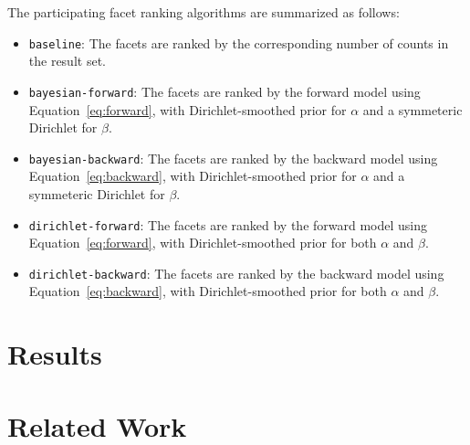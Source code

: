 The participating facet ranking algorithms are summarized as follows:
\begin{itemize}
  \item {\tt baseline}:  The facets are ranked by the corresponding number of counts in the result set.
  \item {\tt bayesian-forward}:  The facets are ranked by the forward model using Equation~\eqref{eq:forward}, with Dirichlet-smoothed prior for $\alpha$ and a symmeteric Dirichlet for $\beta$.
  \item {\tt bayesian-backward}:  The facets are ranked by the backward model using Equation~\eqref{eq:backward}, with Dirichlet-smoothed prior for $\alpha$ and a symmeteric Dirichlet for $\beta$.
  \item {\tt dirichlet-forward}:  The facets are ranked by the forward model using Equation~\eqref{eq:forward}, with Dirichlet-smoothed prior for both $\alpha$ and $\beta$.
  \item {\tt dirichlet-backward}:  The facets are ranked by the backward model using Equation~\eqref{eq:backward}, with Dirichlet-smoothed prior for both $\alpha$ and $\beta$.
\end{itemize}

\section{Results}


\section{Related Work}




